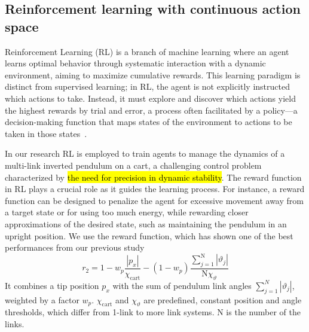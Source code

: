 \subsection{Reinforcement learning with continuous action space}
Reinforcement Learning (RL) is a branch of machine learning where an agent learns optimal behavior through systematic interaction with a dynamic environment, aiming to maximize cumulative rewards. This learning paradigm is distinct from supervised learning; in RL, the agent is not explicitly instructed which actions to take. Instead, it must explore and discover which actions yield the highest rewards by trial and error, a process often facilitated by a policy—a decision-making function that maps states of the environment to actions to be taken in those states~\cite{sutton_reinforcement_2018}.

In our research RL is employed to train agents to manage the dynamics of a multi-link inverted pendulum on a cart, a challenging control problem characterized by \hl{the need for precision in dynamic stability}. The reward function in RL plays a crucial role as it guides the learning process. For instance, a reward function can be designed to penalize the agent for excessive movement away from a target state or for using too much energy, while rewarding closer approximations of the desired state, such as maintaining the pendulum in an upright position. We use the reward function, which has shown one of the best performances from our previous study
\begin{equation}
r_2 = 1 - w_p \frac{\left|p_x\right|}{\chi_\mathrm{cart}} - (1-w_p) \frac{\sum_{j=1}^\mathrm{N} \left|\vartheta_j\right|}{\mathrm{N} \chi_{\vartheta}} \label{eq:reward2}
\end{equation}
It combines a tip position $p_x$ with the sum of pendulum link angles $\sum_{j=1}^{N} \left|\vartheta_j\right|$, weighted by a factor $w_p$. $\chi_\mathrm{cart}$ and $\chi_{\vartheta}$ are predefined, constant position and angle thresholds, which differ from 1-link to more link systems. $\mathrm{N}$ is the number of the links.


